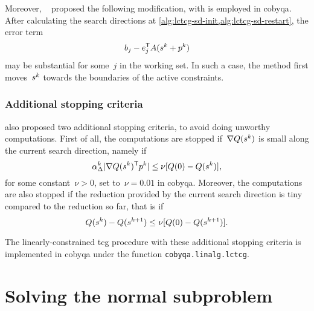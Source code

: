 Moreover, \citeauthor{Powell_2015}~\cite{Powell_2015} proposed the following modification, with is employed in \gls{cobyqa}.
After calculating the search directions at \cref{alg:lctcg-sd-init,alg:lctcg-sd-restart}, the error term
\begin{equation*}
    b_j - e_j^{\T} A(\sstep[k] + \pstep[k])
\end{equation*}
may be substantial for some~$j$ in the working set.
In such a case, the method first moves~$\sstep[k]$ towards the boundaries of the active constraints.

\subsubsection{Additional stopping criteria}

 also proposed two additional stopping criteria, to avoid doing unworthy computations.
First of all, the computations are stopped if~$\nabla Q(\sstep[k])$ is small along the current search direction, namely if
\begin{equation*}
    \alpha_{\rad}^k \abs{\nabla Q(\sstep[k])^{\T} \pstep[k]} \le \nu [Q(0) - Q(\sstep[k])],
\end{equation*}
for some constant~$\nu > 0$, set to~$\nu = 0.01$ in \gls{cobyqa}.
Moreover, the computations are also stopped if the reduction provided by the current search direction is tiny compared to the reduction so far, that is if
\begin{equation*}
    Q(\sstep[k]) - Q(\sstep[k + 1]) \le \nu [Q(0) - Q(\sstep[k + 1])].
\end{equation*}

The linearly-constrained \gls{tcg} procedure with these additional stopping criteria is implemented in \gls{cobyqa} under the function \texttt{cobyqa.linalg.lctcg}.

\section{Solving the normal subproblem}
\label{sec:cobyqa-normal}

